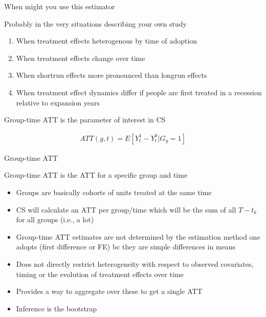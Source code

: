\documentclass{beamer}
\begin{document}
\begin{frame}{When might you use this estimator}

Probably in the very situations describing your own study
\begin{enumerate}
\item When treatment effects heterogenous by time of adoption
\item When treatment effects change over time
\item When shortrun effects more pronounced than longrun effects
\item When treatment effect dynamics differ if people are first treated in a recession relative to expansion years
\end{enumerate}

\end{frame}





\begin{frame}{Group-time ATT is the parameter of interest in CS}

\begin{eqnarray*}
ATT(g,t) = E[Y_t^1 - Y_t^0 | G_g=1]
\end{eqnarray*}

\end{frame}


\begin{frame}{Group-time ATT}

Group-time ATT is the ATT for a specific group and time
\begin{itemize}
\item Groups are basically cohorts of units treated at the same time
\item CS will calculate an ATT per group/time which will be the sum of all $T-t_k$ for all groups (i.e., a lot)
\item Group-time ATT estimates are not determined by the estimation method one adopts (first difference or FE) bc they are simple differences in means
\item Does not directly restrict heterogeneity with respect to observed covariates, timing or the evolution of treatment effects over time
\item Provides a way to aggregate over these to get a single ATT
\item Inference is the bootstrap
\end{itemize}

\end{frame}
\end{document}
